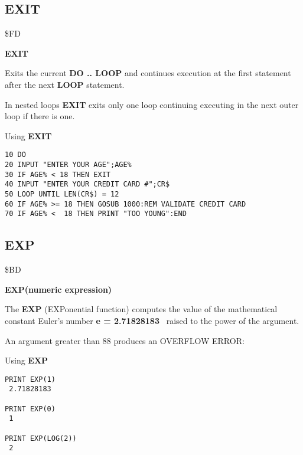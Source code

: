 
\newpage
\subsection{EXIT}
\begin{description}[leftmargin=2cm,style=nextline]
\item [Token:] \$FD
\item [Format:] {\bf EXIT}
\item [Usage:] Exits the current {\bf DO .. LOOP}
               and continues execution at the first
               statement after the next {\bf LOOP} statement.

\item [Remarks:] In nested loops {\bf EXIT} exits only one loop
               continuing executing in the next outer loop
               if there is one.
\item [Example:] Using {\bf EXIT}
\begin{tcolorbox}[colback=black,coltext=white]
\verbatimfont{\codefont}
\begin{verbatim}
10 DO
20 INPUT "ENTER YOUR AGE";AGE%
30 IF AGE%
40 INPUT "ENTER YOUR CREDIT CARD #";CR$
50 LOOP UNTIL LEN(CR$) = 12
60 IF AGE%
70 IF AGE%
\end{verbatim}
\end{tcolorbox}
\end{description}


\newpage
\subsection{EXP}
\begin{description}[leftmargin=2cm,style=nextline]
\item [Token:] \$BD
\item [Format:] {\bf EXP(numeric expression)}
\item [Usage:] The {\bf EXP} (EXPonential function) computes
               the value of the mathematical constant
               Euler's number {\bf e = 2.71828183}
               raised to the power of the
               argument.

\item [Remarks:] An argument greater than 88 produces
                 an OVERFLOW ERROR:
\item [Example:] Using {\bf EXP}
\begin{tcolorbox}[colback=black,coltext=white]
\verbatimfont{\codefont}
\begin{verbatim}
PRINT EXP(1)
 2.71828183

PRINT EXP(0)
 1

PRINT EXP(LOG(2))
 2
\end{verbatim}
\end{tcolorbox}
\end{description}

